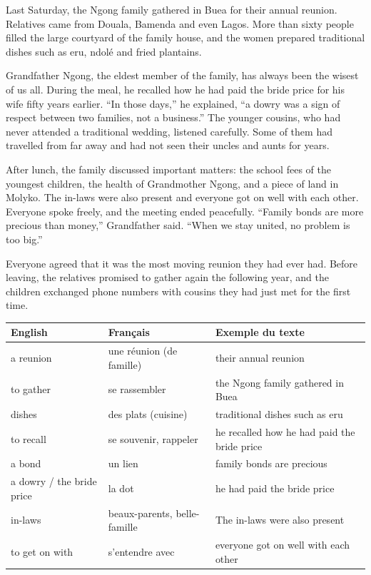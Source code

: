 \documentclass[11pt]{article}
\begin{document}
\begin{textebox}
Last Saturday, the Ngong family gathered in Buea for their annual reunion. Relatives came from Douala, Bamenda and even Lagos. More than sixty people filled the large courtyard of the family house, and the women prepared traditional dishes such as eru, ndolé and fried plantains.

Grandfather Ngong, the eldest member of the family, has always been the wisest of us all. During the meal, he recalled how he had paid the bride price for his wife fifty years earlier. “In those days,” he explained, “a dowry was a sign of respect between two families, not a business.” The younger cousins, who had never attended a traditional wedding, listened carefully. Some of them had travelled from far away and had not seen their uncles and aunts for years.

After lunch, the family discussed important matters: the school fees of the youngest children, the health of Grandmother Ngong, and a piece of land in Molyko. The in-laws were also present and everyone got on well with each other. Everyone spoke freely, and the meeting ended peacefully. “Family bonds are more precious than money,” Grandfather said. “When we stay united, no problem is too big.”

Everyone agreed that it was the most moving reunion they had ever had. Before leaving, the relatives promised to gather again the following year, and the children exchanged phone numbers with cousins they had just met for the first time.
\end{textebox}

\begin{definition}
\begin{center}
\begin{tabularx}{\linewidth}{|l|l|X|}
\hline
\rowcolor{popblueL} \textbf{English} & \textbf{Français} & \textbf{Exemple du texte} \\
\hline
a reunion & une réunion (de famille) & their annual reunion \\
\hline
to gather & se rassembler & the Ngong family gathered in Buea \\
\hline
dishes & des plats (cuisine) & traditional dishes such as eru \\
\hline
to recall & se souvenir, rappeler & he recalled how he had paid the bride price \\
\hline
a bond & un lien & family bonds are precious \\
\hline
a dowry / the bride price & la dot & he had paid the bride price \\
\hline
in-laws & beaux-parents, belle-famille & The in-laws were also present \\
\hline
to get on with & s'entendre avec & everyone got on well with each other \\
\hline
\end{tabularx}
\end{center}
\end{definition}
\end{document}
